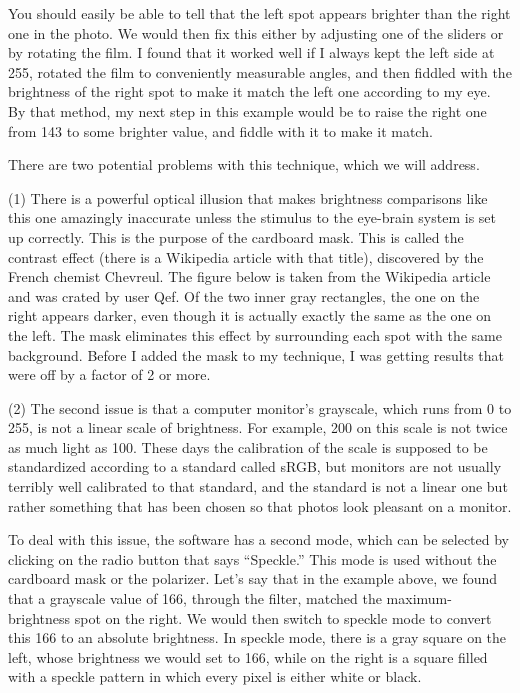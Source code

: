 You should easily be able to tell that the left spot appears brighter than the right
one in the photo. We would then fix this either by adjusting one of the sliders or
by rotating the film. I found that it worked well if I always kept the left side
at 255, rotated the film to conveniently measurable angles, and then fiddled with
the brightness of the right spot to make it match the left one according to my eye.
By that method, my next step in this example would be to raise the right one from
143 to some brighter value, and fiddle with it to make it match.

There are two potential problems with this technique, which we will address.

(1) There is a powerful optical illusion that makes brightness comparisons
like this one amazingly inaccurate unless the stimulus to the eye-brain system
is set up correctly. This is the purpose of the cardboard mask. This is called
the contrast effect (there is a Wikipedia article with that title), discovered
by the French chemist Chevreul.  The figure below is taken from the Wikipedia
article and was crated by user Qef. Of the two inner gray rectangles, the one
on the right appears darker, even though it is actually exactly the same as
the one on the left. The mask eliminates this effect by surrounding each spot
with the same background.
Before I added the mask to my technique, I was getting
results that were off by a factor of 2 or more. 


(2) The second issue is that a computer monitor's grayscale, which runs from 0 to 255,
is not a linear scale of brightness. For example, 200 on this scale is not twice as
much light as 100. These days the calibration of the scale is supposed to be standardized
according to a standard called sRGB, but monitors are not usually terribly well calibrated
to that standard, and the standard is not a linear one but rather something that has
been chosen so that photos look pleasant on a monitor.

To deal with this issue, the software has a second mode, which can be selected by
clicking on the radio button that says ``Speckle.'' This mode is used without the
cardboard mask or the polarizer. Let's say that in the example above, we found that
a grayscale value of 166, through the filter, matched the maximum-brightness spot
on the right. We would then switch to speckle mode to convert this 166 to an absolute
brightness. In speckle mode, there is a gray square on the left, whose brightness we
would set to 166, while on the right is a square filled with a speckle pattern in which
every pixel is either white or black. 

